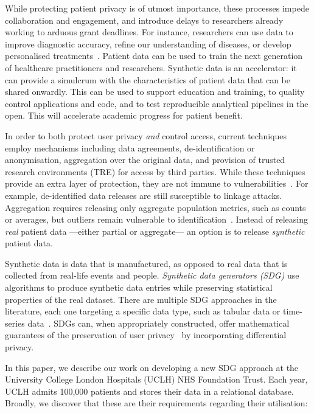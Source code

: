 \documentclass[11pt]{article}
\begin{document}
While protecting patient privacy is of utmost importance, these processes impede collaboration and engagement, and introduce delays to researchers already working to arduous grant deadlines. For instance, researchers can use data to improve diagnostic accuracy, refine our understanding of diseases, or develop personalised treatments~\cite{tucker2020}. Patient data can be used to train the next generation of healthcare practitioners and researchers. Synthetic data is an accelerator: it can provide a simulcrum with the characteristics of patient data that can be shared onwardly. This can be used to support education and training, to quality control applications and code, and to test reproducible analytical pipelines in the open. This will accelerate academic progress for patient benefit.

In order to both protect user privacy \emph{and} control access, current techniques employ mechanisms including data agreements, de-identification or anonymisation, aggregation over the original data, and provision of trusted research environments (TRE) for access by third parties. While these techniques provide an extra layer of protection, they are not immune to vulnerabilities~\cite{near2021}. For example, de-identified data releases are still susceptible to linkage attacks. Aggregation requires releasing only aggregate population metrics, such as counts or averages, but outliers remain vulnerable to identification~\cite{tucker2020}. Instead of releasing \emph{real} patient data ---either partial or aggregate--- an option is to release \emph{synthetic} patient data. 

Synthetic data is data that is manufactured, as opposed to real data that is collected from real-life events and people. \emph{Synthetic data generators (SDG)} use algorithms to produce synthetic data entries while preserving statistical properties of the real dataset. There are multiple SDG approaches in the literature, each one targeting a specific data type, such as tabular data or time-series data~\cite{DBLP:journals/corr/abs-2205-03257}.
SDGs can, when appropriately constructed, offer mathematical guarantees of the preservation of user privacy~\cite{Kopp2021MicrosoftSD, Cai2023} by incorporating differential privacy.

In this paper, we describe our work on developing a new SDG approach at the University College London Hospitals (UCLH) NHS Foundation Trust. Each year, UCLH admits 100,000 patients and stores their data in a relational database. Broadly, we discover that these are their requirements regarding their utilisation:
\end{document}
